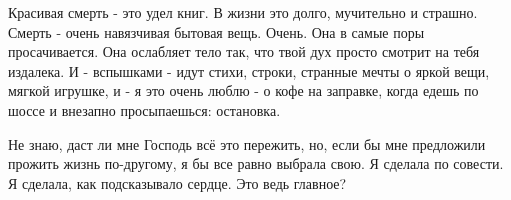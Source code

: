 Красивая смерть - это удел книг. В жизни это долго, мучительно и страшно.
Смерть - очень навязчивая бытовая вещь. Очень. Она в самые поры просачивается.
Она ослабляет тело так, что твой дух просто смотрит на тебя издалека. И -
вспышками - идут стихи, строки, странные мечты о яркой вещи, мягкой игрушке, и
- я это очень люблю - о кофе на заправке, когда едешь по шоссе и внезапно
просыпаешься: остановка. 

Не знаю, даст ли мне Господь всё это пережить, но, если бы мне предложили
прожить жизнь по-другому, я бы все равно выбрала свою. Я сделала по совести. Я
сделала, как подсказывало сердце. Это ведь главное?

